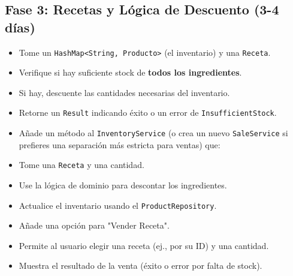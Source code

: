 \documentclass{article}
\begin{document}
	\subsection{Fase 3: Recetas y Lógica de Descuento (3-4 días)}
		\begin{itemize}
			\item Tome un \texttt{HashMap<String, Producto>} (el inventario) y una \texttt{Receta}.
			\item Verifique si hay suficiente stock de \textbf{todos los ingredientes}.
			\item Si hay, descuente las cantidades necesarias del inventario.
			\item Retorne un \texttt{Result} indicando éxito o un error de \texttt{InsufficientStock}.
		\end{itemize}
		\begin{itemize}
			\item Añade un método al \texttt{InventoryService} (o crea un nuevo \texttt{SaleService} si prefieres una separación más estricta para ventas) que:
			\item Tome una \texttt{Receta} y una cantidad.
			\item Use la lógica de dominio para descontar los ingredientes.
			\item Actualice el inventario usando el \texttt{ProductRepository}.
		\end{itemize}
		\begin{itemize}
			\item Añade una opción para "Vender Receta".
			\item Permite al usuario elegir una receta (ej., por su ID) y una cantidad.
			\item Muestra el resultado de la venta (éxito o error por falta de stock).
		\end{itemize}
	
\end{document}
